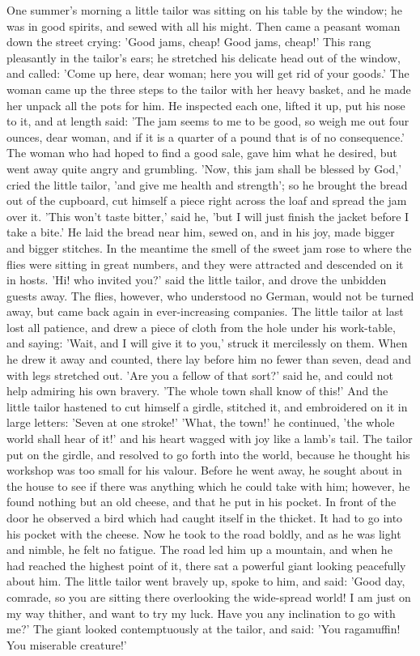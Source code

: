 \documentclass[12pt]{book}
\begin{document}
One summer's morning a little tailor was sitting on his table by the
window; he was in good spirits, and sewed with all his might. Then
came a peasant woman down the street crying: 'Good jams, cheap! Good
jams, cheap!' This rang pleasantly in the tailor's ears; he stretched
his delicate head out of the window, and called: 'Come up here, dear
woman; here you will get rid of your goods.' The woman came up the
three steps to the tailor with her heavy basket, and he made her
unpack all the pots for him. He inspected each one, lifted it up, put
his nose to it, and at length said: 'The jam seems to me to be good,
so weigh me out four ounces, dear woman, and if it is a quarter of a
pound that is of no consequence.' The woman who had hoped to find a
good sale, gave him what he desired, but went away quite angry and
grumbling. 'Now, this jam shall be blessed by God,' cried the little
tailor, 'and give me health and strength'; so he brought the bread out
of the cupboard, cut himself a piece right across the loaf and spread
the jam over it. 'This won't taste bitter,' said he, 'but I will just
finish the jacket before I take a bite.' He laid the bread near him,
sewed on, and in his joy, made bigger and bigger stitches. In the
meantime the smell of the sweet jam rose to where the flies were
sitting in great numbers, and they were attracted and descended on it
in hosts. 'Hi! who invited you?' said the little tailor, and drove the
unbidden guests away. The flies, however, who understood no German,
would not be turned away, but came back again in ever-increasing
companies. The little tailor at last lost all patience, and drew a
piece of cloth from the hole under his work-table, and saying: 'Wait,
and I will give it to you,' struck it mercilessly on them. When he
drew it away and counted, there lay before him no fewer than seven,
dead and with legs stretched out. 'Are you a fellow of that sort?'
said he, and could not help admiring his own bravery. 'The whole town
shall know of this!' And the little tailor hastened to cut himself a
girdle, stitched it, and embroidered on it in large letters: 'Seven at
one stroke!' 'What, the town!' he continued, 'the whole world shall
hear of it!' and his heart wagged with joy like a lamb's tail. The
tailor put on the girdle, and resolved to go forth into the world,
because he thought his workshop was too small for his valour. Before
he went away, he sought about in the house to see if there was
anything which he could take with him; however, he found nothing but
an old cheese, and that he put in his pocket. In front of the door he
observed a bird which had caught itself in the thicket. It had to go
into his pocket with the cheese. Now he took to the road boldly, and
as he was light and nimble, he felt no fatigue. The road led him up a
mountain, and when he had reached the highest point of it, there sat a
powerful giant looking peacefully about him. The little tailor went
bravely up, spoke to him, and said: 'Good day, comrade, so you are
sitting there overlooking the wide-spread world! I am just on my way
thither, and want to try my luck. Have you any inclination to go with
me?' The giant looked contemptuously at the tailor, and said: 'You
ragamuffin! You miserable creature!'
\end{document}
